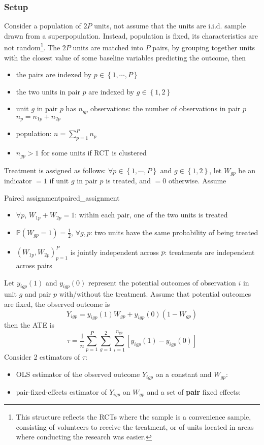 \documentclass[twoside]{article}
\begin{document}
\subsubsection{Setup}
Consider a population of $2P$ units, not assume that the units are i.i.d. sample drawn from a superpopulation. Instead, population is fixed, its characteristics are not random\footnote{This structure reflects the RCTs where the sample is a convenience sample, consisting of volunteers to receive the treatment, or of units located in areas where conducting the research was easier.}.
The $2P$ units are matched into $P$ pairs, by grouping together units with the closest value of some baseline variables predicting the outcome, then 
\begin{itemize}
    \item the pairs are indexed by $p\in \left\{1,\cdots, P\right\}$
    \item the two units in pair $p$ are indexed by $g\in \left\{1,2\right\}$
    \item unit $g$ in pair $p$ has $n_{gp}$ observations: the number of observations in pair $p$ $n_p=n_{1p}+n_{2p}$
    \item population: $n = \sum^P_{p=1} n_p$
    \item $n_{gp}>1$ for some units if RCT is clustered
\end{itemize}

Treatment is assigned as follows: $\forall p\in\left\{1,\cdots,P\right\}$ and $g\in\left\{1,2\right\}$, let $W_{gp}$ be an indicator $=1$ if unit $g$ in pair $p$ is treated, and $=0$ otherwise. Assume 
\begin{assumption}{Paired assignment}{paired_assignment}
    \begin{itemize}
        \item $\forall p$, $W_{1p}+W_{2p}=1$: within each pair, one of the two units is treated
        \item $\mathbb{P}\left(W_{gp}=1\right)=\frac{1}{2}$, $\forall g, p$: two units have the same probability of being treated
        \item $\left(W_{1p},W_{2p}\right)^P_{p=1}$ is jointly independent across $p$: treatments are independent across pairs
    \end{itemize}
\end{assumption}

Let $y_{igp}(1)$ and $y_{igp}(0)$ represent the potential outcomes of observation $i$ in unit $g$ and pair $p$ with/without the treatment. Assume that potential outcomes are fixed, the observed outcome is 
$$
Y_{igp}=y_{igp}(1)W_{gp} + y_{igp}(0)(1-W_{gp})
$$
then the ATE is 
\begin{equation*}
    \tau = \frac{1}{n}\sum^P_{p=1}\sum^2_{g=1}\sum^{n_{gp}}_{i=1}\left[y_{igp}(1)-y_{igp}(0)\right]
\end{equation*}
Consider 2 estimators of $\tau$:
\begin{itemize}
    \item OLS estimator of the observed outcome $Y_{igp}$ on a constant and $W_{gp}$:
    \item pair-fixed-effects estimator of $Y_{igp}$ on $W_{gp}$ and a set of \textbf{pair} fixed effects:
\end{itemize}


\newpage


\end{document}

